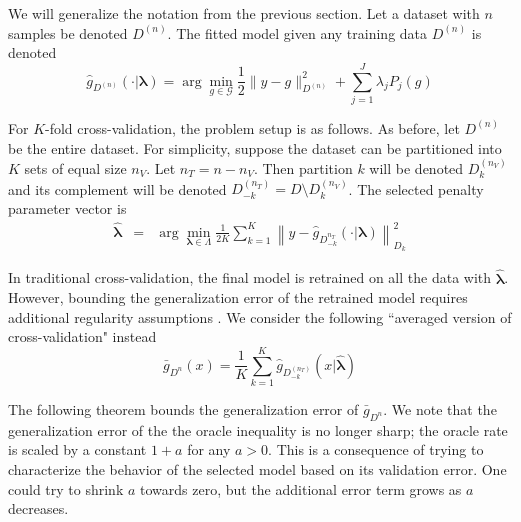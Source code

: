 \documentclass[12pt]{article}
\begin{document}
We will generalize the notation from the previous section. Let a dataset with $n$ samples be denoted $D^{(n)}$. The fitted model given any training data $D^{(n)}$ is denoted
\begin{equation}
\hat{g}_{D^{(n)}}(\cdot | \boldsymbol \lambda)= \arg\min_{g\in\mathcal{G}} \frac{1}{2} \| y-g \|_{D^{(n)}}^{2} + \sum_{j=1}^J \lambda_j P_j(g)
\end{equation}

For $K$-fold cross-validation, the problem setup is as follows. As before, let $D^{(n)}$ be the entire dataset. For simplicity, suppose the dataset can be partitioned into $K$ sets of equal size $n_V$. Let $n_T = n - n_V$. Then partition $k$ will be denoted $D_k^{(n_V)}$ and its complement will be denoted $D_{-k}^{(n_T)} = D \setminus D_k^{(n_V)}$. The selected penalty parameter vector is
\begin{eqnarray}
\label{kfold_opt}
\hat{\boldsymbol \lambda} &=& \arg\min_{\boldsymbol{\lambda} \in\Lambda} \frac{1}{2K} \sum_{k=1}^K  \left \| y-\hat{g}_{D_{-k}^{n_T}}(\cdot | \boldsymbol \lambda) \right \|_{D_k}^{2}
\end{eqnarray}

In traditional cross-validation, the final model is retrained on all the data with $\hat{\boldsymbol{\lambda}}$. However, bounding the generalization error of the retrained model requires additional regularity assumptions \citep{lecue2012oracle}. We consider the following ``averaged version of cross-validation" instead
\begin{equation}
\bar{g}_{D^{n}}(x) = \frac{1}{K} \sum_{k=1}^K \hat{g}_{D^{(n_T)}_{-k}}
(x | \hat{\boldsymbol \lambda})
\end{equation}

The following theorem bounds the generalization error of $\bar{g}_{D^{n}}$. We note that the generalization error of the the oracle inequality is no longer sharp; the oracle rate is scaled by a constant $1+a$ for any $a > 0$. This is a consequence of trying to characterize the behavior of the selected model based on its validation error. One could try to shrink $a$ towards zero, but the additional error term grows as $a$ decreases.
\end{document}
